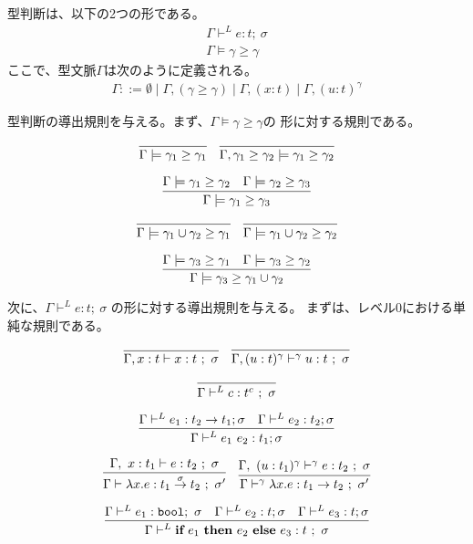 \documentclass[T]{compsoft}
\newcommand\fun[2]{\lambda{#1}.{#2}}
\newcommand\boolT{\mbox{\texttt{bool}}}
\newcommand\funT[3]{{#1} \stackrel{#3}{\rightarrow} {#2}}
\newcommand\ord{\ge}
\newcommand\ift[3]{\textbf{if}~{#1}~\textbf{then}~{#2}~\textbf{else}~{#3}}
\theoremstyle{break}
\begin{document}
型判断は、以下の2つの形である。
\begin{align*}
  \Gamma \vdash^{L} e : t ;~\sigma \\
  \Gamma \models \gamma \ord \gamma
\end{align*}
ここで、型文脈$\Gamma$は次のように定義される。
\begin{align*}
  \Gamma ::= \emptyset
  \mid \Gamma, (\gamma \ord \gamma)
  \mid \Gamma, (x : t)
  \mid \Gamma, (u : t)^{\gamma} 
\end{align*}

型判断の導出規則を与える。まず、$\Gamma \models \gamma \ord \gamma$の
形に対する規則である。

\[
  \infer
  {\Gamma \models \gamma_1 \ord \gamma_1}
  {}
\quad
  \infer
  {\Gamma, \gamma_1 \ord \gamma_2 \models \gamma_1 \ord \gamma_2}
  {}
\]

\[
  \infer
  {\Gamma \models \gamma_1 \ord \gamma_3}
  {\Gamma \models \gamma_1 \ord \gamma_2 & \Gamma \models \gamma_2 \ord \gamma_3}
\]

\[
  \infer
  {\Gamma \models \gamma_1 \cup \gamma_2 \ord \gamma_1}
  {}
\quad
  \infer
  {\Gamma \models \gamma_1 \cup \gamma_2 \ord \gamma_2}
  {}
\]

\[
  \infer
  {\Gamma \models \gamma_3 \ord \gamma_1 \cup \gamma_2}
  {\Gamma \models \gamma_3 \ord \gamma_1
  &\Gamma \models \gamma_3 \ord \gamma_2}
\]



次に、$\Gamma \vdash^{L} e : t ;~\sigma$ の形に対する導出規則を与える。
まずは、レベル0における単純な規則である。

\[
  \infer
  {\Gamma, x : t \vdash x : t ~;~ \sigma}
  {}
\quad
  \infer
  {\Gamma, (u : t)^\gamma \vdash^\gamma u : t ~;~ \sigma}
  {}
\]

\[
  \infer
  {\Gamma \vdash^{L} c : t^c ~;~\sigma}
  {}
\]

\[
  \infer
  {\Gamma \vdash^{L} e_1~ e_2 : t_1 ; \sigma}
  {\Gamma \vdash^{L} e_1 : t_2 \to t_1 ; \sigma
    & \Gamma \vdash^{L} e_2 : t_2  ; \sigma
  }
\]

\[
  \infer
  {\Gamma \vdash \fun{x}{e} : \funT{t_1}{t_2}{\sigma} ~;~\sigma'}
  {\Gamma,~x : t_1 \vdash e : t_2 ~;~ \sigma}
\quad
  \infer
  {\Gamma \vdash^\gamma \fun{x}{e} : \funT{t_1}{t_2}{} ~;~\sigma'}
  {\Gamma,~(u : t_1)^\gamma \vdash^\gamma e : t_2 ~;~ \sigma}
\]

\[
  \infer
  {\Gamma \vdash^{L} \ift{e_1}{e_2}{e_3} : t ~;~ \sigma}
  {\Gamma \vdash^{L} e_1 : \boolT ;~ \sigma
    & \Gamma \vdash^{L} e_2 : t ; \sigma
    & \Gamma \vdash^{L} e_3 : t ; \sigma}
\]
\end{document}

